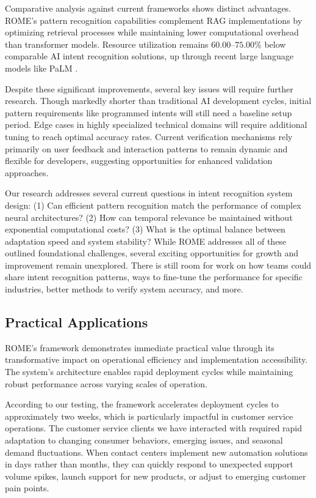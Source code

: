 \documentclass[12pt]{article}
\begin{document}
Comparative analysis against current frameworks shows distinct advantages. ROME's pattern recognition capabilities complement RAG implementations by optimizing retrieval processes while maintaining lower computational overhead than transformer models. Resource utilization remains $60.00$--$75.00\%$ below comparable AI intent recognition solutions, up through recent large language models like PaLM \cite{chowdhery2022}.

Despite these significant improvements, several key issues will require further research. Though markedly shorter than traditional AI development cycles, initial pattern requirements like programmed intents will still need a baseline setup period. Edge cases in highly specialized technical domains will require additional tuning to reach optimal accuracy rates. Current verification mechanisms rely primarily on user feedback and interaction patterns to remain dynamic and flexible for developers, suggesting opportunities for enhanced validation approaches.

Our research addresses several current questions in intent recognition system design: (1) Can efficient pattern recognition match the performance of complex neural architectures? (2) How can temporal relevance be maintained without exponential computational costs? (3) What is the optimal balance between adaptation speed and system stability? While ROME addresses all of these outlined foundational challenges, several exciting opportunities for growth and improvement remain unexplored. There is still room for work on how teams could share intent recognition patterns, ways to fine-tune the performance for specific industries, better methods to verify system accuracy, and more.

\subsection{Practical Applications}
ROME's framework demonstrates immediate practical value through its transformative impact on operational efficiency and implementation accessibility. The system's architecture enables rapid deployment cycles while maintaining robust performance across varying scales of operation.

According to our testing, the framework accelerates deployment cycles to approximately two weeks, which is particularly impactful in customer service operations. The customer service clients we have interacted with required rapid adaptation to changing consumer behaviors, emerging issues, and seasonal demand fluctuations. When contact centers implement new automation solutions in days rather than months, they can quickly respond to unexpected support volume spikes, launch support for new products, or adjust to emerging customer pain points.
\end{document}
